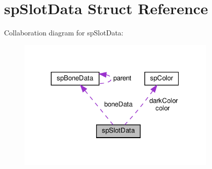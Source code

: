 \hypertarget{structspSlotData}{}\section{sp\+Slot\+Data Struct Reference}
\label{structspSlotData}


Collaboration diagram for sp\+Slot\+Data\+:
\nopagebreak
\begin{figure}[H]
\begin{center}
\leavevmode
\includegraphics[width=269pt]{structspSlotData__coll__graph}
\end{center}
\end{figure}
